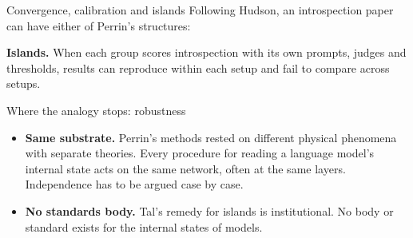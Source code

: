 \documentclass[aspectratio=169,11pt]{beamer}
\begin{document}
\begin{frame}[label=structure]{Convergence, calibration and islands}
Following Hudson, an introspection paper can have either of Perrin's structures:

\vspace{0.3em}
\begin{center}
\end{center}

\vspace{0.4em}
{\small\textbf{Islands.} When each group scores introspection with its own prompts, judges and thresholds, results can reproduce within each setup and fail to compare across setups.}
\end{frame}

\begin{frame}[label=limitsrob]{Where the analogy stops: robustness}
\begin{itemize}\setlength\itemsep{10pt}
  \item {\small \textbf{Same substrate.} Perrin's methods rested on different physical phenomena with separate theories. Every procedure for reading a language model's internal state acts on the same network, often at the same layers. Independence has to be argued case by case.}
  \item {\small \textbf{No standards body.} Tal's remedy for islands is institutional. No body or standard exists for the internal states of models.}
\end{itemize}
\end{frame}
\end{document}
